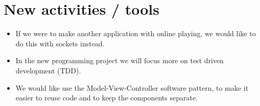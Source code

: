 \documentclass{article}
\begin{document}
\section*{New activities / tools}
\begin{itemize}
\item If we were to make another application with online playing, we would like to do this with sockets instead.
\item In the new programming project we will focus more on test driven development (TDD).
\item We would like use the Model-View-Controller software pattern, to make it easier to reuse code and to keep the components separate.
\end{itemize}
\end{document}
